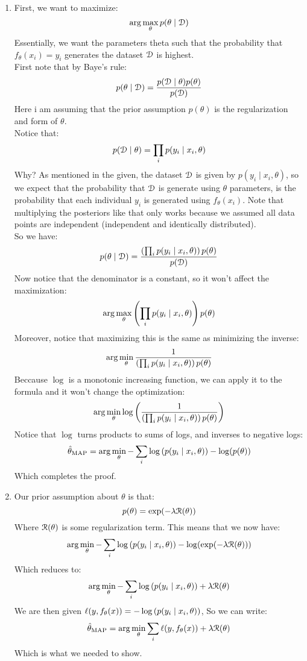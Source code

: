 \documentclass[12pt]{article}
\begin{document}
\begin{enumerate}[label=\letters]
    \item 
    First, we want to maximize:
    \[ \arg \max_\theta p(\theta \mid \mathcal{D}) \]
    Essentially, we want the parameters
    theta such that the probability that
    $f_\theta(x_i) = y_i$ generates the dataset
    $\mathcal{D}$ is highest. \\
    First note that by Baye's rule:
    \[ p(\theta \mid \mathcal{D}) =
    \dfrac{p(\mathcal{D} \mid \theta)p(\theta)}{p(\mathcal{D})} \]
    Here i am assuming that the prior assumption
    $p(\theta)$ is the regularization and form
    of $\theta$. \\
    Notice that:
    \[ p(\mathcal{D} \mid \theta) = \prod_i p(y_i \mid x_i, \theta)\]
    Why? As mentioned in the given, the dataset $\mathcal{D}$
    is given by $p(y_i \mid x_i, \theta)$,
    so we expect that the probability that $\mathcal{D}$
    is generate using $\theta$ parameters,
    is the probability that each individual $y_i$
    is generated using $f_\theta(x_i)$. 
    Note that multiplying the posteriors like that
    only works because we assumed all data points
    are independent (independent and identically
    distributed). \\
    So we have:
    \[ p(\theta \mid \mathcal{D}) =
    \dfrac{\left( \prod_i p(y_i \mid x_i, \theta) \right)
    p(\theta)}{p(\mathcal{D})} \]
    Now notice that the denominator is a constant,
    so it won't affect the maximization:
    \[ \arg \max_\theta \left( \prod_i p(y_i \mid x_i, \theta) \right)
    p(\theta) \]
    Moreover, notice that maximizing this
    is the same as minimizing the inverse:
    \[ \arg \min_\theta \dfrac{1}{\left( \prod_i p(y_i \mid x_i, \theta) \right)
    p(\theta)} \]
    Beccause $\log$ is a monotonic increasing function,
    we can apply it to the formula and it won't change
    the optimization:
    \[ \arg \min_\theta \log\left( \dfrac{1}{\left( \prod_i p(y_i \mid x_i, \theta) \right)
    p(\theta)} \right) \]
    Notice that $\log$ turns products to sums of logs,
    and inverses to negative logs:
    \[ \hat{\theta}_\text{MAP} = 
    \arg \min_\theta -\sum_i\log\left( p(y_i \mid x_i, \theta) \right)
    -\log(p(\theta)) \]
    Which completes the proof. \\
    \item 
    Our prior assumption about $\theta$ is that:
    \[ p(\theta) = \exp(-\lambda \mathcal{R}(\theta)) \]
    Where $\mathcal{R}(\theta)$ is some regularization term.
    This means that we now have:
    \[ \arg \min_\theta -\sum_i\log\left( p(y_i \mid x_i, \theta) \right)
    -\log(\exp(-\lambda \mathcal{R}(\theta))) \]
    Which reduces to:
    \[ \arg \min_\theta -\sum_i\log\left( p(y_i \mid x_i, \theta) \right)
    + \lambda \mathcal{R}(\theta) \]
    We are then given $\ell(y, f_\theta(x)) = 
    -\log\left( p(y_i \mid x_i, \theta) \right)$,
    So we can write:
    \[ \hat{\theta}_\text{MAP} = 
    \arg \min_\theta \sum_i \ell(y, f_\theta(x))
    + \lambda \mathcal{R}(\theta) \]
    Which is what we needed to show. \\
\end{enumerate}
\end{document}
